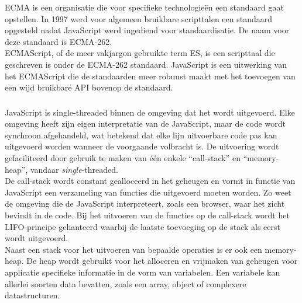 \gls{ECMA} is een organisatie die voor specifieke technologieën een standaard gaat opstellen. In 1997 werd voor algemeen bruikbare scripttalen een standaard opgesteld nadat JavaScript werd ingediend voor standaardisatie. De naam voor deze standaard is \gls{ECMA}-262. \\
\gls{ECMA}Script, of de meer vakjargon gebruikte term ES, is een scripttaal die geschreven is onder de \gls{ECMA}-262 standaard. JavaScript is een uitwerking van het \gls{ECMA}Script die de standaarden meer robuust maakt met het toevoegen van een wijd bruikbare \gls{API} bovenop de standaard.

\subsubsection{}
\label{subsubsec:single-threaded}

JavaScript is single-threaded binnen de omgeving dat het wordt uitgevoerd. Elke omgeving heeft zijn eigen interpretatie van de JavaScript, maar de code wordt synchroon afgehandeld, wat betekend dat elke lijn uitvoerbare code pas kan uitgevoerd worden wanneer de voorgaande volbracht is. De uitvoering wordt gefaciliteerd door gebruik te maken van één enkele ``call-stack'' en ``memory-heap'', vandaar \emph{single}-threaded. \\
De call-stack wordt constant gealloceerd in het geheugen en vormt in functie van JavaScript een verzameling van functies die uitgevoerd moeten worden. Zo weet de omgeving die de JavaScript interpreteert, zoals een browser, waar het zicht bevindt in de code. Bij het uitvoeren van de functies op de call-stack wordt het \gls{LIFO}-principe gehanteerd waarbij de laatste toevoeging op de stack als eerst wordt uitgevoerd. \\
Naast een stack voor het uitvoeren van bepaalde operaties is er ook een memory-heap. De heap wordt gebruikt voor het alloceren en vrijmaken van geheugen voor applicatie specifieke informatie in de vorm van variabelen. Een variabele kan allerlei soorten data bevatten, zoals een array, object of complexere datastructuren.

